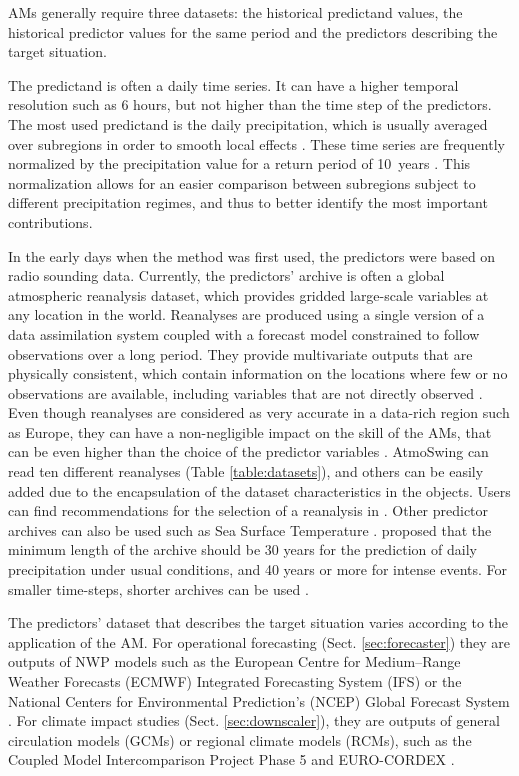 \documentclass[gmdd]{copernicus}
\begin{document}
AMs generally require three datasets: the historical predictand values, the historical predictor values for the same period and the predictors describing the target situation.

The predictand is often a daily time series. It can have a higher temporal resolution such as 6 hours, but not higher than the time step of the predictors. The most used predictand is the daily precipitation, which is usually averaged over subregions in order to smooth local effects \citep{Obled2002, Marty2012}. These time series are frequently normalized by the precipitation value for a return period of 10~years \citep{Djerboua2001}. This normalization allows for an easier comparison between subregions subject to different precipitation regimes, and thus to better identify the most important contributions.

In the early days when the method was first used, the predictors were based on radio sounding data. Currently, the predictors' archive is often a global atmospheric reanalysis dataset, which provides gridded large-scale variables at any location in the world. Reanalyses are produced using a single version of a data assimilation system coupled with a forecast model constrained to follow observations over a long period. They provide multivariate outputs that are physically consistent, which contain information on the locations where few or no observations are available, including variables that are not directly observed \citep{Gelaro2017}. Even though reanalyses are considered as very accurate in a data-rich region such as Europe, they can have a non-negligible impact on the skill of the AMs, that can be even higher than the choice of the predictor variables \cite{Dayon2015, Horton2018b}. AtmoSwing can read ten different reanalyses (Table \ref{table:datasets}), and others can be easily added due to the encapsulation of the dataset characteristics in the objects. Users can find recommendations for the selection of a reanalysis in \cite{Horton2018b}. Other predictor archives can also be used such as Sea Surface Temperature \citep[SST, ][]{Reynolds2007}. \citet{Bontron2004} proposed that the minimum length of the archive should be 30 years for the prediction of daily precipitation under usual conditions, and 40 years or more for intense events. For smaller time-steps, shorter archives can be used \citep{Horton2017b}.

The predictors’ dataset that describes the target situation varies according to the application of the AM. For operational forecasting (Sect. \ref{sec:forecaster}) they are outputs of NWP models such as the European Centre for Medium--Range Weather Forecasts (ECMWF) Integrated Forecasting System (IFS) or the National Centers for Environmental Prediction's (NCEP) Global Forecast System \citep[GFS,][]{Kanamitsu1991,Kanamitsu1989}. For climate impact studies (Sect. \ref{sec:downscaler}), they are outputs of general circulation models (GCMs) or regional climate models (RCMs), such as the Coupled Model Intercomparison Project Phase 5 \citep[CMIP5,][]{Taylor2012} and EURO-CORDEX \citep{Jacob2014}.
\end{document}
